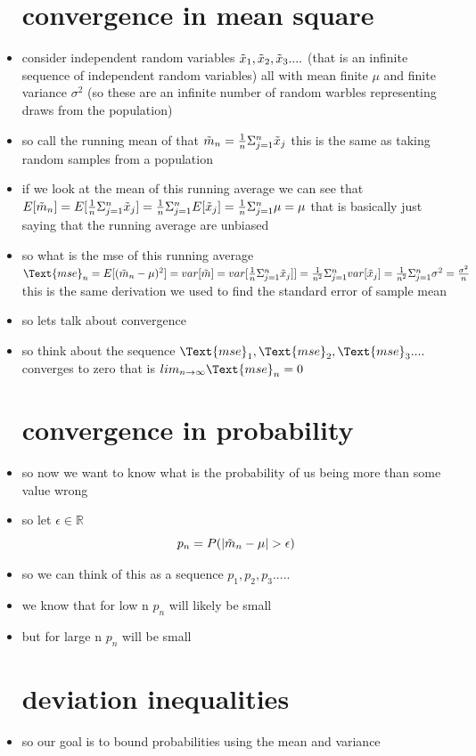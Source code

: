 \documentclass{article}
\begin{document}
\begin{itemize}
\section{convergence in mean square}
\item consider independent random variables $\Tilde{x}_1,\Tilde{x}_2,\Tilde{x}_3....$ (that is an infinite sequence of independent random variables) all with mean finite $\mu$ and finite variance $\sigma^2$ (so these are an infinite number of random warbles representing draws from the population)
\item so call the running mean of that $\Tilde{m}_{n}=\frac{1}{n}\Sigma_{j=1}^{n}\Tilde{x}_j$ this is the same as taking random samples from a population
\item if we look at the mean of this running average we can see that $E[\Tilde{m}_{n}]=E[\frac{1}{n}\Sigma_{j=1}^{n}\Tilde{x}_j]=\frac{1}{n}\Sigma_{j=1}^{n}E[\Tilde{x}_j]=\frac{1}{n}\Sigma_{j=1}^{n}\mu=\mu$ that is basically just saying that the running average are unbiased 
\item so what is the mse of this running average $\Text{mse}_{n}=E[(\Tilde{m}_{n}-\mu)^2]=var[\Tilde{m}]=var[\frac{1}{n}\Sigma_{j=1}^{n}\Tilde{x}_j]]=\frac{1}{n^2}\Sigma_{j=1}^{n}var[\Tilde{x}_j]=\frac{1}{n^2}\Sigma_{j=1}^{n}\sigma^2=\frac{\sigma^2}{n}$ this is the same derivation we used to find the standard error of sample mean 
\item so lets talk about convergence 
\item so think about the sequence  $\Text{mse}_{1},\Text{mse}_{2},\Text{mse}_{3}....$ converges to zero that is $lim_{n\rightarrow \infty}\Text{mse}_{n}=0$
\section{convergence in probability}
\item so now we want to know what is the probability of us being more than some value wrong
\item so let $\epsilon\in\mathbb{R}$ $$p_{n}=P(|\Tilde{m}_{n}-\mu|>\epsilon)$$
\item so we can think of this as a sequence $p_1,p_2,p_3.....$
\item we know that for low n $p_n$ will likely be small 
\item but for large n $p_n$ will be small
\section{deviation inequalities}
\item so our goal is to bound probabilities using the mean and variance

\end{itemize}
\end{document}
